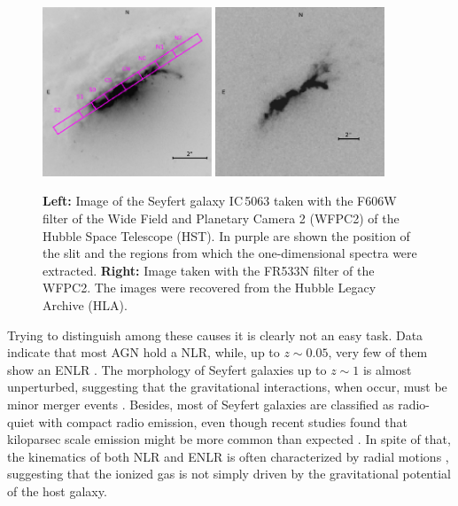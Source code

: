 \documentclass[../main.tex]{subfiles}
\begin{document}
\begin{figure}
\centering
\includegraphics[width=0.45\textwidth]{images/paper1/ic5063slit.jpg} 
\quad
\includegraphics[width=0.45\textwidth]{images/paper1/IC5063_o32.jpg} 
\caption[]{\textbf{Left:} Image of the Seyfert galaxy IC\,5063 taken with the F606W filter of the Wide Field and Planetary Camera 2 (WFPC2) of the Hubble Space Telescope (HST). In purple are shown the position of the slit and the regions from which the one-dimensional spectra were extracted. \textbf{Right:} Image taken with the FR533N filter of the WFPC2. The images were recovered from the Hubble Legacy Archive (HLA).}
\label{fig:IC5063}
\end{figure}

Trying to distinguish among these causes it is clearly not an easy task. 
Data indicate that most AGN hold a NLR, while, up to $z\sim0.05$, very few of them show an ENLR  \citep{Netzer15}. 
The morphology of Seyfert galaxies up to $z\sim1$ is almost unperturbed, suggesting that the gravitational interactions, when occur, must be minor merger events \citep{Cisternas11}. 
Besides, most of Seyfert galaxies are classified as radio-quiet \citep{Singh15} with compact radio emission, even though recent studies found that kiloparsec scale emission might be more common than expected \citep[e.g.][]{Gallimore06, Singh15}. 
In spite of that, the kinematics of both NLR and ENLR is often characterized by radial motions \citep[e.g.][]{Morganti07,Ozaki09,Cracco11,Netzer15} , suggesting that the ionized gas is not simply driven by the gravitational potential of the host galaxy.
\end{document}
